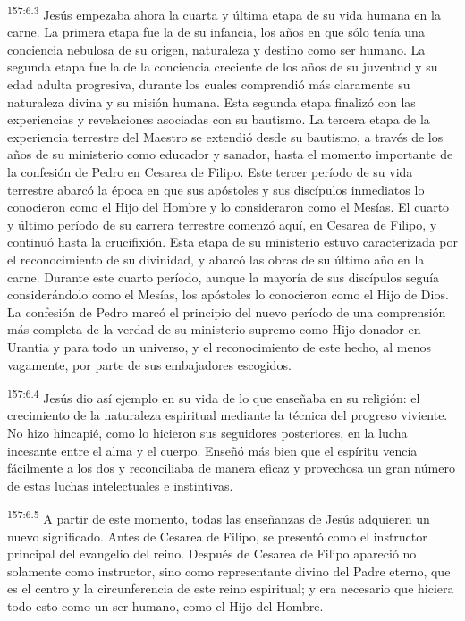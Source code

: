 \par 
\textsuperscript{157:6.3} Jesús empezaba ahora la cuarta y última etapa de su vida humana en la carne. La primera etapa fue la de su infancia, los años en que sólo tenía una conciencia nebulosa de su origen, naturaleza y destino como ser humano. La segunda etapa fue la de la conciencia creciente de los años de su juventud y su edad adulta progresiva, durante los cuales comprendió más claramente su naturaleza divina y su misión humana. Esta segunda etapa finalizó con las experiencias y revelaciones asociadas con su bautismo. La tercera etapa de la experiencia terrestre del Maestro se extendió desde su bautismo, a través de los años de su ministerio como educador y sanador, hasta el momento importante de la confesión de Pedro en Cesarea de Filipo. Este tercer período de su vida terrestre abarcó la época en que sus apóstoles y sus discípulos inmediatos lo conocieron como el Hijo del Hombre y lo consideraron como el Mesías. El cuarto y último período de su carrera terrestre comenzó aquí, en Cesarea de Filipo, y continuó hasta la crucifixión. Esta etapa de su ministerio estuvo caracterizada por el reconocimiento de su divinidad, y abarcó las obras de su último año en la carne. Durante este cuarto período, aunque la mayoría de sus discípulos seguía considerándolo como el Mesías, los apóstoles lo conocieron como el Hijo de Dios. La confesión de Pedro marcó el principio del nuevo período de una comprensión más completa de la verdad de su ministerio supremo como Hijo donador en Urantia y para todo un universo, y el reconocimiento de este hecho, al menos vagamente, por parte de sus embajadores escogidos.

\par 
\textsuperscript{157:6.4} Jesús dio así ejemplo en su vida de lo que enseñaba en su religión: el crecimiento de la naturaleza espiritual mediante la técnica del progreso viviente. No hizo hincapié, como lo hicieron sus seguidores posteriores, en la lucha incesante entre el alma y el cuerpo. Enseñó más bien que el espíritu vencía fácilmente a los dos y reconciliaba de manera eficaz y provechosa un gran número de estas luchas intelectuales e instintivas.

\par 
\textsuperscript{157:6.5} A partir de este momento, todas las enseñanzas de Jesús adquieren un nuevo significado. Antes de Cesarea de Filipo, se presentó como el instructor principal del evangelio del reino. Después de Cesarea de Filipo apareció no solamente como instructor, sino como representante divino del Padre eterno, que es el centro y la circunferencia de este reino espiritual; y era necesario que hiciera todo esto como un ser humano, como el Hijo del Hombre.

